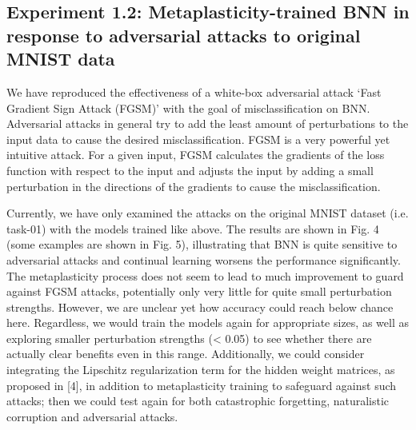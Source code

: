 \documentclass[manuscript,screen,review]{acmart}
\begin{document}
\subsection{Experiment 1.2: Metaplasticity-trained BNN in response to adversarial attacks to original MNIST data}

We have reproduced the effectiveness of a white-box adversarial attack ‘Fast Gradient Sign Attack (FGSM)’ with the goal of misclassification on BNN. Adversarial attacks in general try to add the least amount of perturbations to the input data to cause the desired misclassification. FGSM is a very powerful yet intuitive attack. For a given input, FGSM calculates the gradients of the loss function with respect to the input and adjusts the input by adding a small perturbation in the directions of the gradients to cause the misclassification. 

Currently, we have only examined the attacks on the original MNIST dataset (i.e. task-01) with the models trained like above. The results are shown in Fig. 4 (some examples are shown in Fig. 5), illustrating that BNN is quite sensitive to adversarial attacks and continual learning worsens the performance significantly. The metaplasticity process does not seem to lead to much improvement to guard against FGSM attacks, potentially only very little for quite small perturbation strengths. However, we are unclear yet how accuracy could reach below chance here. Regardless, we would train the models again for appropriate sizes, as well as exploring smaller perturbation strengths (< 0.05) to see whether there are actually clear benefits even in this range. Additionally, we could consider integrating the Lipschitz regularization term for the hidden weight matrices, as proposed in [4], in addition to metaplasticity training to safeguard against such attacks; then we could test again for both catastrophic forgetting, naturalistic corruption and adversarial attacks. 
\end{document}

